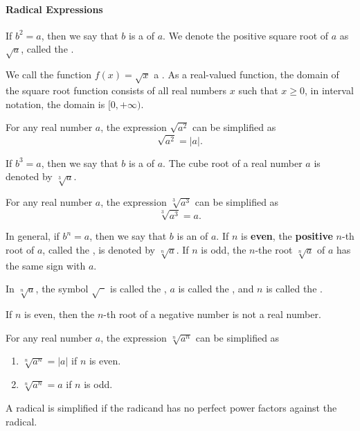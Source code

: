 
\paragraph*{Radical Expressions}
	If $b^2=a$, then we say that $b$ is a  of $a$. We denote the positive square root of $a$ as $\sqrt{a}$, called the .

	We call the function $f(x)=\sqrt{x}$ a . As a real-valued function, the domain of the square root function consists of all real numbers $x$ such that $x\ge 0$, in interval notation, the domain is $[0,+\infty)$.

	For any real number $a$, the expression $\sqrt{a^2}$ can be simplified as
	\[
		\sqrt{a^2}=|a|.
	\]

	If $b^3=a$, then we say that $b$ is a  of $a$. The cube root of a real number $a$ is denoted by $\sqrt[3]{a}$.

	For any real number $a$, the expression $\sqrt[3]{a^3}$ can be simplified as
	\[
		\sqrt[3]{a^3}=a.
	\]

	In general, if $b^n=a$, then we say that $b$ is an  of $a$.  If $n$ is \textbf{even}, the \textbf{positive} $n$-th root of $a$, called the , is denoted by $\sqrt[n]{a}$. If $n$ is odd,  the $n$-the root $\sqrt[n]{a}$ of $a$ has the same sign with $a$.

	In $\sqrt[n]{a}$, the symbol $\sqrt{\phantom{a}}$ is called the , $a$ is called  the , and $n$ is called the .

	If $n$ is even, then the $n$-th root of a negative number is not a real number.

	For any real number $a$, the expression $\sqrt[n]{a^n}$ can be simplified as
	\begin{enumerate}
		\item  $\sqrt[n]{a^n}=|a|$ if $n$ is even.
		\item  $\sqrt[n]{a^n}=a$ if $n$ is odd.
	\end{enumerate}

	A radical is simplified if the radicand has no perfect power factors against the radical.

